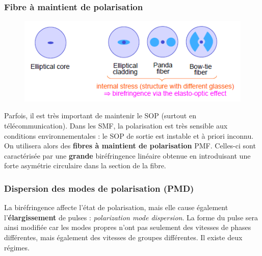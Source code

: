 \subsubsection{Fibre à maintient de polarisation}
	\begin{figure}
	\vspace{-5mm}
	\includegraphics[scale=0.64]{ch1/image48}
	\end{figure}
Parfois, il est très important de maintenir le SOP (surtout en télécommunication). Dans les SMF, 
la polarisation est très sensible aux conditions environnementales : le SOP de sortie est instable
et à priori inconnu. On utilisera alors des \textbf{fibres à maintient de polarisation} PMF. Celles-ci
sont caractérisée par une \textbf{grande} biréfringence linéaire obtenue en introduisant une forte
asymétrie circulaire dans la section de la fibre.


\subsubsection{Dispersion des modes de polarisation (PMD)}
La biréfringence affecte l'état de polarisation, mais elle cause également l'\textbf{élargissement}
de pulses : \textit{polarization mode dispersion}. La forme du pulse sera ainsi modifiée car 
les modes propres n'ont pas seulement des vitesses de phases différentes, mais également des
vitesses de groupes différentes. Il existe deux régimes.\\

